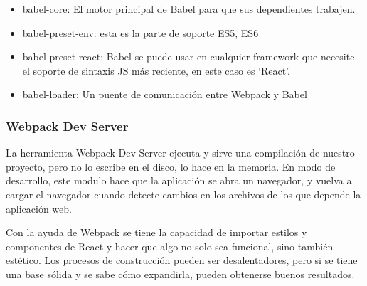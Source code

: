 \begin{itemize}
  \item babel-core: El motor principal de Babel para que sus dependientes trabajen.

  \item babel-preset-env: esta es la parte de soporte ES5, ES6

  \item babel-preset-react: Babel se puede usar en cualquier \gls{framework} que necesite el soporte de sintaxis JS más reciente, en este caso es `React'.

  \item babel-loader: Un puente de comunicación entre Webpack y Babel
\end{itemize}
\vspace{0.8cm}





\subsubsection{Webpack Dev Server}
La herramienta Webpack Dev Server ejecuta y sirve una compilación de nuestro proyecto, pero no lo escribe en el disco, lo hace en la memoria. En modo de desarrollo, este modulo hace que la aplicación se abra un navegador, y vuelva a cargar el navegador cuando detecte cambios en los archivos de los que depende la aplicación web.
\vspace{0.8cm}



Con la ayuda de Webpack se tiene la capacidad de importar estilos y componentes de React y hacer que algo no solo sea funcional, sino también estético. Los procesos de construcción pueden ser desalentadores, pero si se tiene una base sólida y se sabe cómo expandirla, pueden obtenerse buenos resultados.
\vspace{0.8cm}

